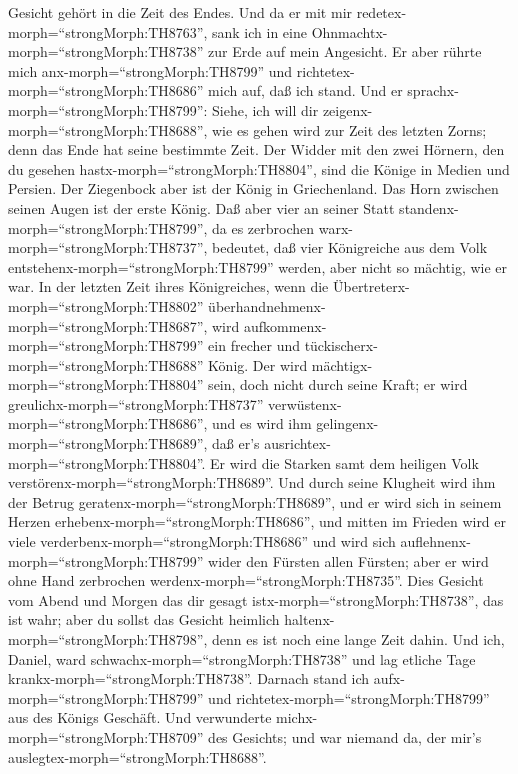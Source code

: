 Gesicht gehört in die Zeit des Endes.  Und da er mit mir
redetex-morph=``strongMorph:TH8763'', sank ich in eine
Ohnmachtx-morph=``strongMorph:TH8738'' zur Erde auf mein Angesicht. Er
aber rührte mich anx-morph=``strongMorph:TH8799'' und
richtetex-morph=``strongMorph:TH8686'' mich auf, daß ich stand.
 Und er sprachx-morph=``strongMorph:TH8799'': Siehe, ich
will dir zeigenx-morph=``strongMorph:TH8688'', wie es gehen wird zur
Zeit des letzten Zorns; denn das Ende hat seine bestimmte Zeit.
 Der Widder mit den zwei Hörnern, den du gesehen
hastx-morph=``strongMorph:TH8804'', sind die Könige in Medien und
Persien.  Der Ziegenbock aber ist der König in
Griechenland. Das Horn zwischen seinen Augen ist der erste König.
 Daß aber vier an seiner Statt
standenx-morph=``strongMorph:TH8799'', da es zerbrochen
warx-morph=``strongMorph:TH8737'', bedeutet, daß vier Königreiche aus
dem Volk entstehenx-morph=``strongMorph:TH8799'' werden, aber nicht so
mächtig, wie er war.  In der letzten Zeit ihres
Königreiches, wenn die Übertreterx-morph=``strongMorph:TH8802''
überhandnehmenx-morph=``strongMorph:TH8687'', wird
aufkommenx-morph=``strongMorph:TH8799'' ein frecher und
tückischerx-morph=``strongMorph:TH8688'' König.  Der wird
mächtigx-morph=``strongMorph:TH8804'' sein, doch nicht durch seine
Kraft; er wird greulichx-morph=``strongMorph:TH8737''
verwüstenx-morph=``strongMorph:TH8686'', und es wird ihm
gelingenx-morph=``strongMorph:TH8689'', daß er's
ausrichtex-morph=``strongMorph:TH8804''. Er wird die Starken samt dem
heiligen Volk verstörenx-morph=``strongMorph:TH8689''.  Und
durch seine Klugheit wird ihm der Betrug
geratenx-morph=``strongMorph:TH8689'', und er wird sich in seinem Herzen
erhebenx-morph=``strongMorph:TH8686'', und mitten im Frieden wird er
viele verderbenx-morph=``strongMorph:TH8686'' und wird sich
auflehnenx-morph=``strongMorph:TH8799'' wider den Fürsten allen Fürsten;
aber er wird ohne Hand zerbrochen werdenx-morph=``strongMorph:TH8735''.
 Dies Gesicht vom Abend und Morgen das dir gesagt
istx-morph=``strongMorph:TH8738'', das ist wahr; aber du sollst das
Gesicht heimlich haltenx-morph=``strongMorph:TH8798'', denn es ist noch
eine lange Zeit dahin.  Und ich, Daniel, ward
schwachx-morph=``strongMorph:TH8738'' und lag etliche Tage
krankx-morph=``strongMorph:TH8738''. Darnach stand ich
aufx-morph=``strongMorph:TH8799'' und
richtetex-morph=``strongMorph:TH8799'' aus des Königs Geschäft. Und
verwunderte michx-morph=``strongMorph:TH8709'' des Gesichts; und war
niemand da, der mir's auslegtex-morph=``strongMorph:TH8688''.

